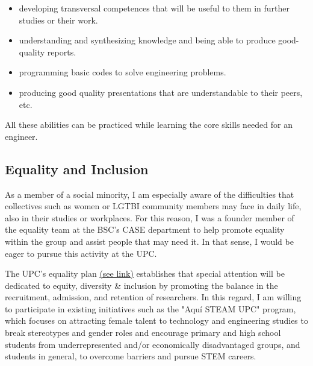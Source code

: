 \documentclass{article}
\begin{document}
\begin{itemize}
\item developing transversal competences that will be useful to them in further studies or their work.
\item understanding and synthesizing knowledge and being able to produce good-quality reports. 
\item programming basic codes to solve engineering problems.
\item producing good quality presentations that are understandable to their peers, etc.
\end{itemize}

All these abilities can be practiced while learning the core skills needed for an engineer.

\subsection{Equality and Inclusion}

As a member of a social minority, I am especially aware of the difficulties that collectives such as women or LGTBI community members may face in daily life, also in their studies or workplaces. For this reason, I was a founder member of the equality team at the BSC's CASE department to help promote equality within the group and assist people that may need it. In that sense, I would be eager to pursue this activity at the UPC. 

The UPC's equality plan \href{https://igualtat.upc.edu/ca/shared/third-upc-gender-equality-plan.pdf}{(see link)} establishes that special attention will be dedicated to equity, diversity \& inclusion by promoting the balance in the recruitment, admission, and retention of researchers. In this regard, I am willing to participate in existing initiatives such as the "Aquí STEAM UPC" program, which focuses on attracting female talent to technology and engineering studies to break stereotypes and gender roles and encourage primary and high school students from underrepresented and/or economically disadvantaged groups, and students in general, to overcome barriers and pursue STEM careers. 


\newpage
\end{document}
